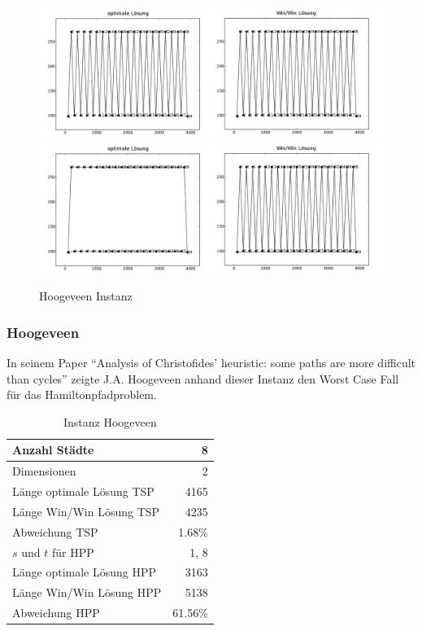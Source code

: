 \documentclass[11pt,a4paper]{article}
\begin{document}
\begin{figure}[H]
        \centering
        \includegraphics[width=16cm]{gfx/christofides_hpp_comparison}
        \includegraphics[width=16cm]{gfx/christofides_tsp_comparison}
        \caption{Hoogeveen Instanz}
        \label{img:christofides_comparison}
\end{figure}

\subsubsection{Hoogeveen}
In seinem Paper "`Analysis of Christofides' heuristic: some paths are more difficult than cycles"'\cite{hoogeveen91} zeigte J.A. Hoogeveen anhand dieser Instanz den Worst Case Fall für das Hamiltonpfadproblem.

\begin{table}[H]
        \centering
        \begin{tabular}{| l | r |}
            \hline
                Anzahl Städte               & 8             \\ \hline
                Dimensionen                 & 2             \\ \hline
                Länge optimale Lösung TSP   & 4165          \\ \hline
                Länge Win/Win Lösung  TSP   & 4235          \\ \hline
                Abweichung TSP              & 1.68\%        \\ \hline
                $s$ und $t$ für HPP         & 1, 8          \\ \hline
                Länge optimale Lösung HPP   & 3163          \\ \hline
                Länge Win/Win Lösung  HPP   & 5138          \\ \hline
                Abweichung HPP              & 61.56\%       \\ \hline
        \end{tabular}
        \caption{Instanz Hoogeveen}
        \label{tab:instanz_hoogeveen}
\end{table}
\end{document}
